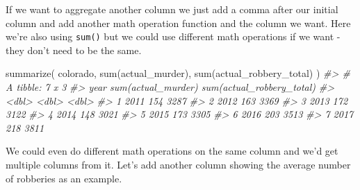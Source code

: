 \documentclass[
]{krantz}
\makeatletter
\newenvironment{Shaded}{\begin{snugshade}}{\end{snugshade}}
\newcommand{\CommentTok}[1]{\textcolor[rgb]{0.37,0.37,0.37}{\textit{#1}}}
\newcommand{\FunctionTok}[1]{\textcolor[rgb]{0,0,0}{#1}}
\newcommand{\NormalTok}[1]{#1}
\newenvironment{kframe}{%
\medskip{}
\setlength{\fboxsep}{.8em}
 \def\at@end@of@kframe{}%
 \ifinner\ifhmode%
  \def\at@end@of@kframe{\end{minipage}}%
  \begin{minipage}{\columnwidth}%
 \fi\fi%
 \def\FrameCommand##1{\hskip\@totalleftmargin \hskip-\fboxsep
 \colorbox{shadecolor}{##1}\hskip-\fboxsep
     \hskip-\linewidth \hskip-\@totalleftmargin \hskip\columnwidth}%
 \MakeFramed {\advance\hsize-\width
   \@totalleftmargin\z@ \linewidth\hsize
   \@setminipage}}%
 {\par\unskip\endMakeFramed%
 \at@end@of@kframe}
\renewenvironment{Shaded}{\begin{kframe}}{\end{kframe}}
\makeatother
\begin{document}
If we want to aggregate another column we just add a comma
after our initial column and add another math operation
function and the column we want. Here we're also using
\texttt{sum()} but we could use different math operations if
we want - they don't need to be the same.

\begin{Shaded}
\begin{Highlighting}[]
\FunctionTok{summarize}\NormalTok{(}
\NormalTok{  colorado, }\FunctionTok{sum}\NormalTok{(actual\_murder),}
  \FunctionTok{sum}\NormalTok{(actual\_robbery\_total)}
\NormalTok{)}
\CommentTok{\#\textgreater{} \# A tibble: 7 x 3}
\CommentTok{\#\textgreater{}    year \textasciigrave{}sum(actual\_murder)\textasciigrave{} \textasciigrave{}sum(actual\_robbery\_total)\textasciigrave{}}
\CommentTok{\#\textgreater{}   \textless{}dbl\textgreater{}                \textless{}dbl\textgreater{}                       \textless{}dbl\textgreater{}}
\CommentTok{\#\textgreater{} 1  2011                  154                        3287}
\CommentTok{\#\textgreater{} 2  2012                  163                        3369}
\CommentTok{\#\textgreater{} 3  2013                  172                        3122}
\CommentTok{\#\textgreater{} 4  2014                  148                        3021}
\CommentTok{\#\textgreater{} 5  2015                  173                        3305}
\CommentTok{\#\textgreater{} 6  2016                  203                        3513}
\CommentTok{\#\textgreater{} 7  2017                  218                        3811}
\end{Highlighting}
\end{Shaded}

We could even do different math operations on the same
column and we'd get multiple columns from it. Let's add
another column showing the average number of robberies as an
example.
\end{document}
